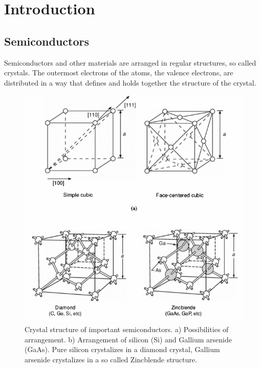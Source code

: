 \documentclass[report]{subfiles}
\begin{document}
\section{Introduction}

\subsection{Semiconductors}
Semiconductors and other materials are arranged in regular structures, so called crystals. The outermost electrons of the atoms, the valence electrons, are distributed in a way that defines and holds together the structure of the crystal.

\begin{figure}[H]
\centering
\includegraphics[scale=0.3]{pics/crystal_structure.png}
\caption{Crystal structure of important semiconductors. a) Possibilities of arrangement. b) Arrangement of silicon (Si) and Gallium arsenide (GaAs). Pure silicon crystalizes in a diamond crystal, Gallium arsenide crystalizes in a so called Zincblende structure.}
\end{figure}
\end{document}

